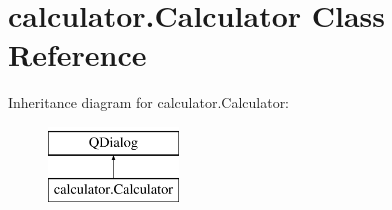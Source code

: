 \hypertarget{classcalculator_1_1Calculator}{}\section{calculator.\+Calculator Class Reference}
\label{classcalculator_1_1Calculator}
Inheritance diagram for calculator.\+Calculator\+:\begin{figure}[H]
\begin{center}
\leavevmode
\includegraphics[height=2.000000cm]{classcalculator_1_1Calculator}
\end{center}
\end{figure}
